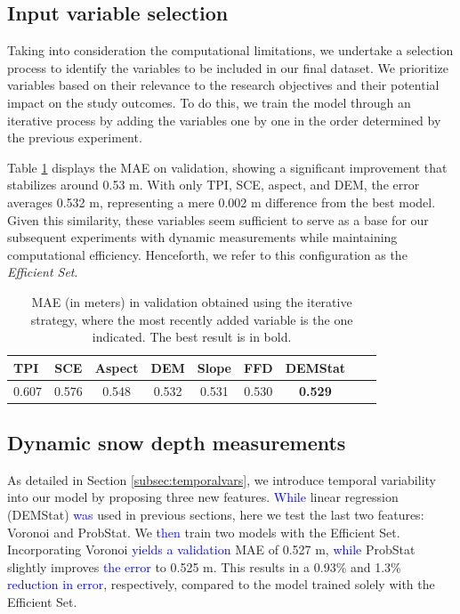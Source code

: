 \documentclass[preprint,12pt]{elsarticle}
\begin{document}

\subsection{Input variable selection}

Taking into consideration the computational limitations, we undertake a selection process to identify the variables to be included in our final dataset. We prioritize variables based on their relevance to the research objectives and their potential impact on the study outcomes. To do this, we train the model through an iterative process by adding the variables one by one in the order determined by the previous experiment.

Table \ref{Tab:Iterative} displays the MAE on validation, showing a significant improvement that stabilizes around 0.53 m. With only TPI, SCE, aspect, and DEM, the error averages 0.532 m, representing a mere 0.002 m difference from the best model. Given this similarity, these variables seem sufficient to serve as a base for our subsequent experiments with dynamic measurements while maintaining computational efficiency. Henceforth, we refer to this configuration as the \textit{Efficient Set}.

\begin{table}[htbp]
\caption{ MAE (in meters) in validation obtained using the iterative strategy, where the most recently added variable is the one indicated. The best result is in bold.} 
\label{Tab:Iterative}
\centering
\begin{tabular}{lcccccccc}
\hline
TPI & SCE & Aspect & DEM & Slope & FFD & DEMStat \\ \hline
0.607 & 0.576 & 0.548 & 0.532 & 0.531 & 0.530 & \textbf{0.529} \\ \hline
\end{tabular}
\end{table}

\subsection{Dynamic snow depth measurements}
\label{subsec:otras_temp}

As detailed in Section \ref{subsec:temporalvars}, we introduce temporal variability into our model by proposing three new features. \textcolor{blue}{While} linear regression (DEMStat) \textcolor{blue}{was} used in previous sections, here we test the last two features: Voronoi and ProbStat. We \textcolor{blue}{then} train two models with the Efficient Set. Incorporating Voronoi \textcolor{blue}{yields a validation} MAE of 0.527 m, \textcolor{blue}{while} ProbStat slightly improves \textcolor{blue}{the error} to 0.525 m. This results in a 0.93\% and 1.3\% \textcolor{blue}{reduction in error}, respectively, compared to the model trained solely with the Efficient Set.
\end{document}

